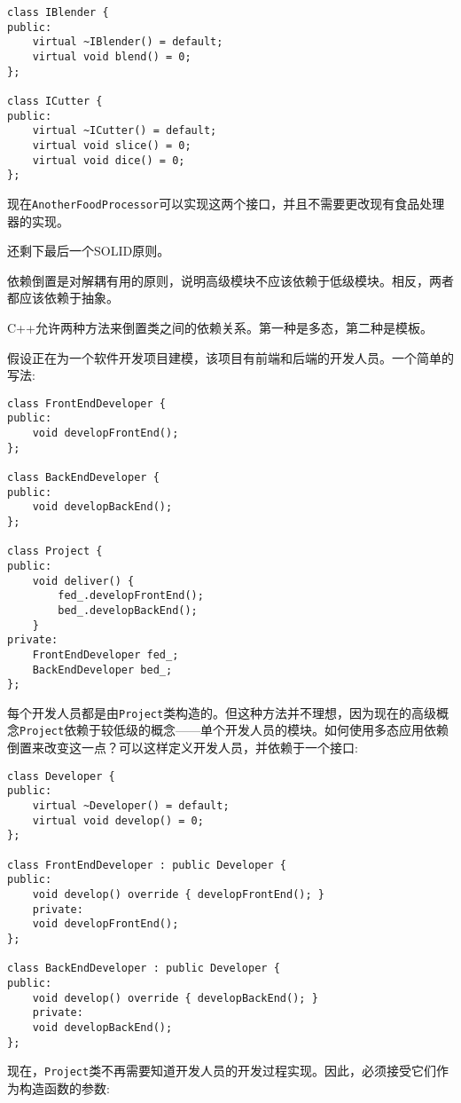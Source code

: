 \begin{lstlisting}[style=styleCXX]
class IBlender {
public:
	virtual ~IBlender() = default;
	virtual void blend() = 0;
};

class ICutter {
public:
	virtual ~ICutter() = default;
	virtual void slice() = 0;
	virtual void dice() = 0;
};
\end{lstlisting}

现在\texttt{AnotherFoodProcessor}可以实现这两个接口，并且不需要更改现有食品处理器的实现。

还剩下最后一个SOLID原则。


依赖倒置是对解耦有用的原则，说明高级模块不应该依赖于低级模块。相反，两者都应该依赖于抽象。

C++允许两种方法来倒置类之间的依赖关系。第一种是多态，第二种是模板。

假设正在为一个软件开发项目建模，该项目有前端和后端的开发人员。一个简单的写法:

\begin{lstlisting}[style=styleCXX]
class FrontEndDeveloper {
public:
	void developFrontEnd();
};

class BackEndDeveloper {
public:
	void developBackEnd();
};

class Project {
public:
	void deliver() {
		fed_.developFrontEnd();
		bed_.developBackEnd();
	}
private:
	FrontEndDeveloper fed_;
	BackEndDeveloper bed_;
};
\end{lstlisting}

每个开发人员都是由\texttt{Project}类构造的。但这种方法并不理想，因为现在的高级概念\texttt{Project}依赖于较低级的概念——单个开发人员的模块。如何使用多态应用依赖倒置来改变这一点？可以这样定义开发人员，并依赖于一个接口:

\begin{lstlisting}[style=styleCXX]
class Developer {
public:
	virtual ~Developer() = default;
	virtual void develop() = 0;
};

class FrontEndDeveloper : public Developer {
public:
	void develop() override { developFrontEnd(); }
	private:
	void developFrontEnd();
};

class BackEndDeveloper : public Developer {
public:
	void develop() override { developBackEnd(); }
	private:
	void developBackEnd();
};
\end{lstlisting}

现在，\texttt{Project}类不再需要知道开发人员的开发过程实现。因此，必须接受它们作为构造函数的参数:

